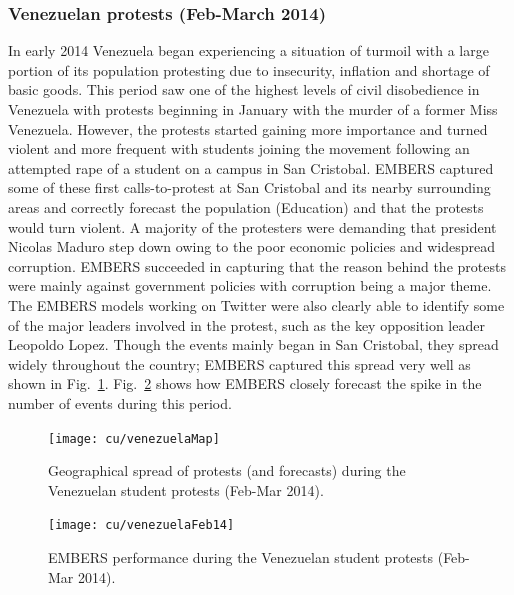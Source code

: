 \subsubsection*{Venezuelan protests (Feb-March 2014)}
In early 2014 Venezuela began experiencing a situation of turmoil with a
large portion of its population protesting due to insecurity, inflation
and shortage of basic goods. This period saw one of the highest levels of
civil disobedience in Venezuela with protests beginning in January with the murder
of a former Miss Venezuela. However, the protests started gaining more importance
 and turned violent and more frequent with students joining the movement following an
attempted rape of a student on a campus in San Cristobal. EMBERS captured
some of these first calls-to-protest at San Cristobal and its nearby surrounding areas
 and correctly forecast the population (Education) and that the protests would turn violent.
A majority of the protesters were demanding that president Nicolas Maduro step down owing
to the poor economic policies and widespread corruption. EMBERS succeeded
in capturing
that the reason behind the protests were mainly against government policies with corruption being
a major theme.
The EMBERS models working on Twitter were also clearly able to identify some of the major
leaders involved in the protest, such as the key
opposition leader Leopoldo Lopez.
Though the events mainly began in
San Cristobal, they spread widely throughout the country; EMBERS
captured this spread very well as shown in Fig.~\ref{fig:venezuelaMap}.
Fig.~\ref{fig:venezuelaMarch14}
shows how EMBERS closely forecast the spike in the number of events  during this period.

\begin{figure} %
\centering
\texttt{[image: cu/venezuelaMap]}
\caption{Geographical spread of protests (and forecasts) during
the Venezuelan student protests (Feb-Mar 2014).}
\label{fig:venezuelaMap}
\end{figure}

\begin{figure} %
\centering
\texttt{[image: cu/venezuelaFeb14]}
\caption{EMBERS performance during the Venezuelan student protests (Feb-Mar 2014).}
\label{fig:venezuelaMarch14}
\end{figure}

